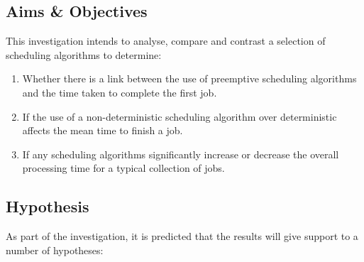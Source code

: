 \documentclass{acm_proc_article-sp}
\begin{document}
\subsection{Aims \& Objectives}  

This investigation intends to analyse, compare and contrast a selection of scheduling algorithms to determine:
\vspace{-3mm}

\begin{enumerate}

\item Whether there is a link between the use of preemptive scheduling algorithms and the time taken to complete the first job.  

\item If the use of a non-deterministic scheduling algorithm over deterministic affects the mean time to finish a job. 

\item If any scheduling algorithms significantly increase or decrease the overall processing time for a typical collection of jobs.

\end{enumerate}

\subsection{Hypothesis}

As part of the investigation, it is predicted that the results will give support to a number of hypotheses:
\vspace{-3mm}
\end{document}
